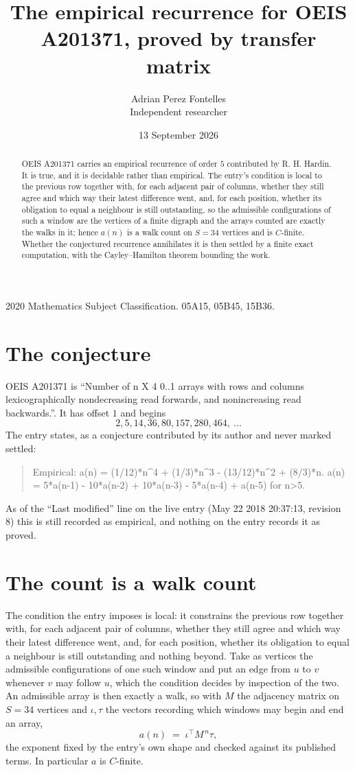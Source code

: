 \documentclass[11pt,a4paper]{article}
\title{The empirical recurrence for OEIS A201371, proved by transfer matrix}
\author{Adrian Perez Fontelles\\ \small Independent researcher}
\date{13 September 2026}
\theoremstyle{plain}
\theoremstyle{definition}
\begin{document}
\maketitle

\begin{abstract}
OEIS A201371 carries an empirical recurrence of order $5$ contributed by R. H. Hardin. It is
true, and it is decidable rather than empirical. The entry's condition is local to the previous row together with, for each adjacent pair of columns, whether they still agree and which way their latest difference went, and, for each position, whether its obligation to equal a neighbour is still outstanding, so
the admissible configurations of such a window are the vertices of a finite digraph and the
arrays counted are exactly the walks in it; hence $a(n)$ is a walk count on $S=34$ vertices
and is $C$-finite. Whether the conjectured recurrence annihilates it is then settled by a
finite exact computation, with the Cayley--Hamilton theorem bounding the work.
\end{abstract}

\noindent\small 2020 Mathematics Subject Classification. 05A15, 05B45, 15B36.\normalsize

\section{The conjecture}

OEIS A201371 is ``Number of n X 4 0..1 arrays with rows and columns lexicographically nondecreasing read forwards, and nonincreasing read backwards.''. It has offset $1$ and begins
\[
2, 5, 14, 36, 80, 157, 280, 464,\ \dots
\]
The entry states, as a conjecture contributed by its author and never marked settled:
\begin{quote}
Empirical: a(n) = (1/12)*n\^{}4 + (1/3)*n\^{}3 - (13/12)*n\^{}2 + (8/3)*n. a(n) = 5*a(n-1) - 10*a(n-2) + 10*a(n-3) - 5*a(n-4) + a(n-5) for n>5.
\end{quote}
As of the ``Last modified'' line on the live entry (May 22 2018 20:37:13, revision 8) this is still
recorded as empirical, and nothing on the entry records it as proved.

\section{The count is a walk count}

The condition the entry imposes is local: it constrains the previous row together with, for each adjacent pair of columns, whether they still agree and which way their latest difference went, and, for each position, whether its obligation to equal a neighbour is still outstanding and nothing beyond. Take as
vertices the admissible configurations of one such window and put an edge from $u$ to $v$
whenever $v$ may follow $u$, which the condition decides by inspection of the two. An
admissible array is then exactly a walk, so with $M$ the adjacency matrix on $S=34$ vertices
and $\iota,\tau$ the vectors recording which windows may begin and end an array,
\[
a(n)\;=\;\iota^{\!\top}M^{\,n}\tau ,
\]
the exponent fixed by the entry's own shape and checked against its published terms. In
particular $a$ is $C$-finite.
\end{document}
